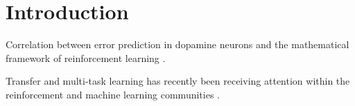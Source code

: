 \section{Introduction}

Correlation between error prediction in dopamine neurons and the mathematical framework of reinforcement learning \cite{schultz1993responses}.

Transfer and multi-task learning has recently been receiving attention within
the reinforcement and machine learning communities \cite{Li2009,Taylor2009}.
